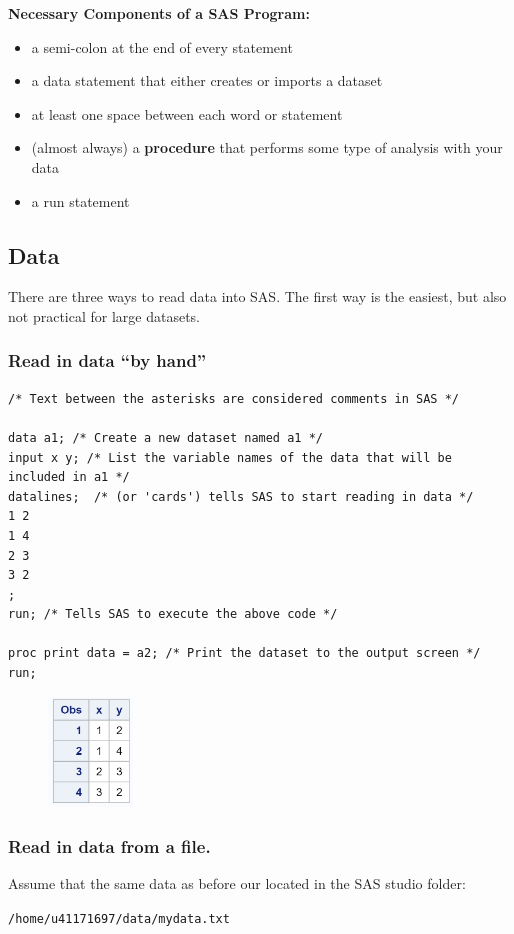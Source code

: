\documentclass[12pt]{../notes}
\begin{document}
\nspace
\textbf{Necessary Components of a SAS Program:}
\begin{itemize}
\item a semi-colon at the end of every statement 
\item a data statement that either creates or imports a dataset
\item at least one space between each word or statement
\item (almost always) a \textbf{procedure} that performs some type of analysis with your data
\item a run statement 
\end{itemize}

\subsection*{Data}
There are three ways to read data into SAS. The first way is the easiest, but also not practical for large datasets. 

\subsubsection*{Read in data ``by hand''}
\begin{verbatim}
/* Text between the asterisks are considered comments in SAS */

data a1; /* Create a new dataset named a1 */
input x y; /* List the variable names of the data that will be included in a1 */
datalines;  /* (or 'cards') tells SAS to start reading in data */
1 2
1 4
2 3
3 2
;
run; /* Tells SAS to execute the above code */

proc print data = a2; /* Print the dataset to the output screen */
run;
\end{verbatim}

\begin{figure}[H]
\centering
\includegraphics[width = 0.2\textwidth]{../figures/module1/sas1.png}
\end{figure}

\subsubsection*{Read in data from a file.}
Assume that the same data as before our located in the SAS studio folder:
\begin{center}
\texttt{/home/u41171697/data/mydata.txt}
\end{center}
\end{document}
